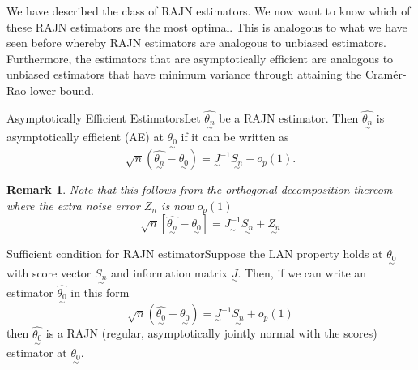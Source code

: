 \documentclass[twoside]{article}
\newtheorem{remark}[theorem]{Remark}
\newcommand{\utilde}{\underset{\sim}}
\begin{document}
We have described the class of RAJN estimators. We now want to know which of these RAJN estimators are the most optimal. This is analogous to what we have seen before whereby RAJN estimators are analogous to unbiased estimators. Furthermore, the estimators that are asymptotically efficient are analogous to unbiased estimators that have minimum variance through attaining the Cramér-Rao lower bound.
\begin{definition_exam}{Asymptotically Efficient Estimators}{}Let $\hat{\utilde{\theta_n}}$ be a RAJN estimator. Then $\hat{\utilde{\theta_n}}$ is asymptotically efficient (AE) at $\utilde{\theta_0}$ if it can be written as 
$$
\sqrt{n}(\hat{\utilde{\theta_n}} - \utilde{\theta_0}) = \utilde{J}^{-1}\utilde{S_n} + o_p(1).
$$
\end{definition_exam}

\begin{remark} Note that this follows from the orthogonal decomposition thereom where the extra noise error $Z_n$ is now $o_p(1)$
$$
\sqrt{n}[\hat{\utilde{\theta_n}} - \utilde{\theta_0}] = \utilde{J^{-1}}\utilde{S_n} + \utilde{Z_n}
$$
\end{remark}

\begin{theorem_exam}{Sufficient condition for RAJN estimator}{}Suppose the LAN property holds at $\utilde{\theta_0}$ with score vector $\utilde{S_n}$ and information matrix $\utilde{J}.$ Then, if we can write an estimator $\hat{\utilde{\theta_0}}$ in this form $$\sqrt{n}(\hat{\utilde{\theta_0}} - \utilde{\theta_0}) = \utilde{J}^{-1}\utilde{S_n} + o_p(1)$$ then $\hat{\utilde{\theta_0}} $ is a RAJN (regular, asymptotically jointly normal with the scores) estimator at $\utilde{\theta_0}$.
\end{theorem_exam}
\end{document}
